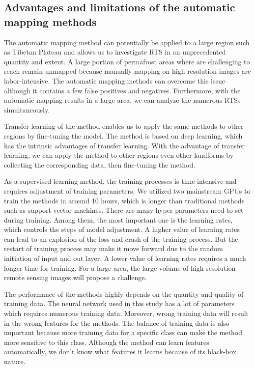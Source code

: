 \documentclass[preprint,12pt,authoryear]{elsarticle}
\begin{document}
\subsection{Advantages and limitations of the automatic mapping methods}
\label{subsec_advantage_limitation_method}

The automatic mapping method can potentially be applied to a large region such as Tibetan Plateau and allows us to investigate RTS in an unprecedented quantity and extent. A large portion of permafrost areas where are challenging to reach remain unmapped because manually mapping on high-resolution images are labor-intensive. The automatic mapping methods can overcome this issue although it contains a few false positives and negatives. Furthermore, with the automatic mapping results in a large area, we can analyze the numerous RTSs simultaneously. 

Transfer learning of the method enables us to apply the same methods to other regions by fine-tuning the model. The method is based on deep learning, which has the intrinsic advantages of transfer learning. With the advantage of transfer learning, we can apply the method to other regions even other landforms by collecting the corresponding data, then fine-tuning the method. 

As a supervised learning method, the training processes is time-intensive and requires adjustment of training parameters. We utilized two mainstream GPUs to train the methods in around 10 hours, which is longer than traditional methods such as support vector machines. There are many hyper-parameters need to set during training. Among them, the most important one is the learning rates, which controls the steps of model adjustment. A higher value of learning rates can lead to an explosion of the loss and crash of the training process. But the restart of training process may make it move forward due to the random initiation of input and out layer. A lower value of learning rates requires a much longer time for training. For a large area, the large volume of high-resolution remote sensing images will propose a challenge.

The performance of the methods highly depends on the quantity and quality of training data. The neural network used in this study has a lot of parameters which requires numerous training data. Moreover, wrong training data will result in the wrong features for the methods. The balance of training data is also important because more training data for a specific class can make the method more sensitive to this class. Although the method can learn features automatically, we don’t know what features it learns because of its black-box nature. 
\end{document}
